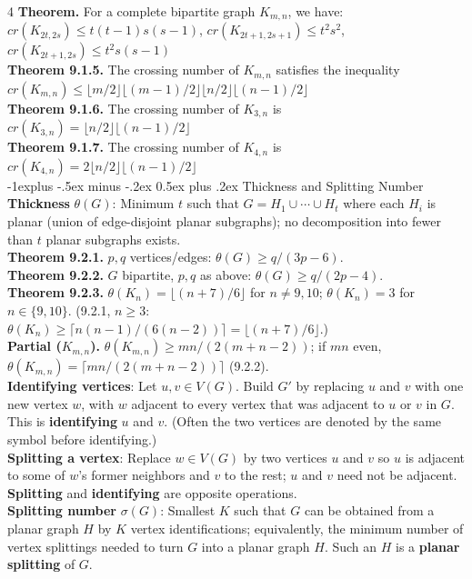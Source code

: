 \documentclass[letterpaper, 8pt]{extarticle}
\makeatletter
\renewcommand{\section}{\@startsection{section}{1}{0mm}%
	{-1explus -.5ex minus -.2ex}%
	{0.5ex plus .2ex}%
	{\normalfont\normalsize\bfseries}}
\makeatother
\begin{document}
\begin{multicols*}{4}
	\textbf{Theorem.} For a complete bipartite graph $K_{m,n}$, we have: $cr(K_{2t,2s}) \le t(t-1)s(s-1)$, $cr(K_{2t+1,2s+1}) \le t^{2}s^{2}$, $cr(K_{2t+1,2s}) \le t^{2}s(s-1)$ \\
	\textbf{Theorem 9.1.5.} The crossing number of $K_{m,n}$ satisfies the inequality $cr(K_{m,n}) \le \lfloor m/2 \rfloor \lfloor (m-1)/2 \rfloor \lfloor n/2 \rfloor \lfloor (n-1)/2 \rfloor$ \\
	\textbf{Theorem 9.1.6.} The crossing number of $K_{3,n}$ is $cr(K_{3,n}) = \lfloor n/2 \rfloor \lfloor (n-1)/2 \rfloor$ \\
	\textbf{Theorem 9.1.7.} The crossing number of $K_{4,n}$ is $cr(K_{4,n}) = 2 \lfloor n/2 \rfloor \lfloor (n-1)/2 \rfloor$ \\

	\section{Thickness and Splitting Number}
	\textbf{Thickness} $\theta(G)$: Minimum $t$ such that $G = H_1 \cup \cdots \cup H_t$ where each $H_i$ is planar (union of edge-disjoint planar subgraphs); no decomposition into fewer than $t$ planar subgraphs exists. \\
	\textbf{Theorem 9.2.1.} $p,q$ vertices/edges: $\theta(G)\ge q/(3p-6)$. \\
	\textbf{Theorem 9.2.2.} $G$ bipartite, $p,q$ as above: $\theta(G)\ge q/(2p-4)$. \\
	\textbf{Theorem 9.2.3.} $\theta(K_n)=\lfloor(n+7)/6\rfloor$ for $n\neq 9,10$; $\theta(K_n)=3$ for $n\in\{9,10\}$. (9.2.1, $n\ge 3$: $\theta(K_n)\ge\lceil n(n-1)/(6(n-2))\rceil=\lfloor(n+7)/6\rfloor$.) \\
	\textbf{Partial ($K_{m,n}$).} $\theta(K_{m,n})\ge mn/(2(m+n-2))$; if $mn$ even, $\theta(K_{m,n})=\lceil mn/(2(m+n-2))\rceil$ (9.2.2). \\
	\textbf{Identifying vertices}: Let $u,v \in V(G)$. Build $G'$ by replacing $u$ and $v$ with one new vertex $w$, with $w$ adjacent to every vertex that was adjacent to $u$ or $v$ in $G$. This is \textbf{identifying} $u$ and $v$. (Often the two vertices are denoted by the same symbol before identifying.) \\
	\textbf{Splitting a vertex}: Replace $w \in V(G)$ by two vertices $u$ and $v$ so $u$ is adjacent to some of $w$'s former neighbors and $v$ to the rest; $u$ and $v$ need not be adjacent. \textbf{Splitting} and \textbf{identifying} are opposite operations. \\
	\textbf{Splitting number} $\sigma(G)$: Smallest $K$ such that $G$ can be obtained from a planar graph $H$ by $K$ vertex identifications; equivalently, the minimum number of vertex splittings needed to turn $G$ into a planar graph $H$. Such an $H$ is a \textbf{planar splitting} of $G$. \\

\end{multicols*}
\end{document}
